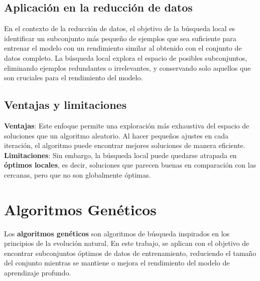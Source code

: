 \subsection{Aplicación en la reducción de datos}\label{subsec:aplicacion-en-la-reduccion-de-datos2}
En el contexto de la reducción de datos, el objetivo de la búsqueda local es identificar un subconjunto más pequeño de
ejemplos que sea suficiente para entrenar el modelo con un rendimiento similar al obtenido con el conjunto de datos
completo.
La búsqueda local explora el espacio de posibles subconjuntos, eliminando ejemplos redundantes o irrelevantes, y
conservando solo aquellos que son cruciales para el rendimiento del modelo.

\subsection{Ventajas y limitaciones}\label{subsec:ventajas-y-limitaciones}
\textbf{Ventajas}: Este enfoque permite una exploración más exhaustiva del espacio de soluciones que un algoritmo
aleatorio.
Al hacer pequeños ajustes en cada iteración, el algoritmo puede encontrar mejores soluciones de manera eficiente.
\textbf{Limitaciones}: Sin embargo, la búsqueda local puede quedarse atrapada en \textbf{óptimos locales}, es decir,
soluciones que parecen buenas en comparación con las cercanas, pero que no son globalmente óptimas.

\section{Algoritmos Genéticos}\label{sec:algoritmos-geneticos}
Los \textbf{algoritmos genéticos} son algoritmos de búsqueda inspirados en los principios de la evolución natural.
En este trabajo, se aplican con el objetivo de encontrar subconjuntos óptimos de datos de entrenamiento, reduciendo el
tamaño del conjunto mientras se mantiene o mejora el rendimiento del modelo de aprendizaje profundo.

